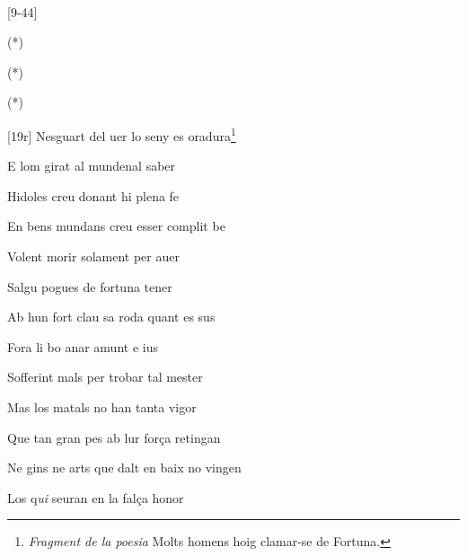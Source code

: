 \documentclass[12pt]{article}
\renewcommand{\espaiAbansEtiquetaPoema}{\vspace{0ex}}
\begin{document}
\begin{estrofa}

\espaiAbansEtiquetaPoema

\\

\end{estrofa}




\begin{estrofaBuida}


\end{estrofaBuida}


\begin{estrofaExtra}%




\begin{Versos}

[9-44]

\end{Versos}


\end{estrofaExtra}


\begin{estrofa}

 (*)

 (*)

 (*)

 [19r] Nesguart del uer lo seny es oradura\footnote{\textit{Fragment de la
poesia} Molts homens hoig clamar-se de Fortuna.}

 E lom girat al mundenal saber

 Hidoles creu donant hi plena fe

 En bens mundans creu esser complit be

 Volent morir solament per auer

\end{estrofa}



\begin{estrofa}

 Salgu pogues de fortuna tener

 Ab hun fort clau sa roda quant es sus

 Fora li bo anar amunt e ius

 Sofferint mals per trobar tal mester

 Mas los matals no han tanta vigor

 Que tan gran pes ab lur for\c{c}a retingan

 Ne gins ne arts que dalt en baix no vingen

 Los q\textit{ui} seuran en la fal\c{c}a honor

\end{estrofa}
\end{document}
